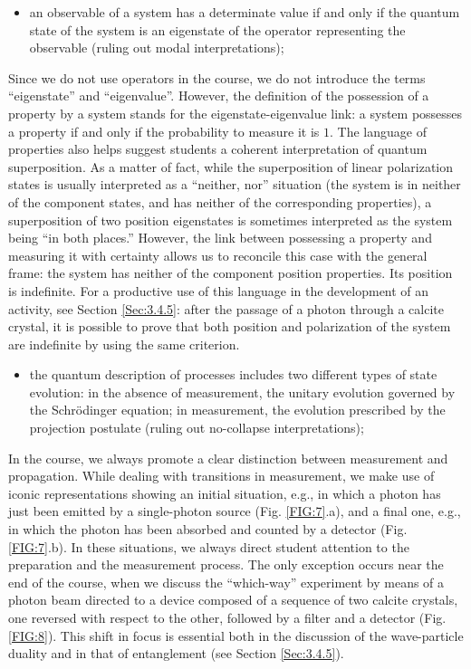 \documentclass[twocolumn,secnumarabic,amssymb, nobibnotes, aps, prd, nofootinbib]{revtex4-2}
\begin{document}
\begin{itemize}
    \item an observable of a system has a determinate value if and only if the quantum state of the system is an eigenstate of the operator representing the observable (ruling out modal interpretations);
\end{itemize}

Since we do not use operators in the course, we do not introduce the terms ``eigenstate'' and ``eigenvalue''. However, the definition of the possession of a property by a system stands for the eigenstate-eigenvalue link: a system possesses a property if and only if the probability to measure it is $1$. The language of properties also helps suggest students a coherent interpretation of quantum superposition. As a matter of fact, while the superposition of linear polarization states is usually interpreted as a ``neither, nor'' situation (the system is in neither of the component states, and has neither of the corresponding properties), a superposition of two position eigenstates is sometimes interpreted as the system being ``in both places.'' However, the link between possessing a property and measuring it with certainty allows us to reconcile this case with the general frame: the system has neither of the component position properties. Its position is indefinite. For a productive use of this language in the development of an activity, see Section \ref{Sec:3.4.5}: after the passage of a photon through a calcite crystal, it is possible to prove that both position and polarization of the system are indefinite by using the same criterion.

\begin{itemize}
    \item the quantum description of processes includes two different types of state evolution: in the absence of measurement, the unitary evolution governed by the Schr\"{o}dinger equation; in measurement, the evolution prescribed by the projection postulate (ruling out no-collapse interpretations);
\end{itemize}

In the course, we always promote a clear distinction between measurement and propagation. While dealing with transitions in
measurement, we make use of iconic representations showing an initial situation, e.g., in which a photon has just been emitted by a
single-photon source (Fig. \ref{FIG:7}.a), and a final one, e.g., in which the photon has been absorbed and counted by a detector (Fig. \ref{FIG:7}.b). In these situations, we always direct student attention to the preparation and the measurement process.
The only exception occurs near the end of the course, when we discuss the ``which-way'' experiment by means of a photon beam directed to a device composed of a sequence of two calcite crystals, one reversed with respect to the other, followed by a filter and a detector (Fig. \ref{FIG:8}). This shift in focus is essential both in the discussion of the wave-particle duality and in that of entanglement (see Section \ref{Sec:3.4.5}).\\
\end{document}
